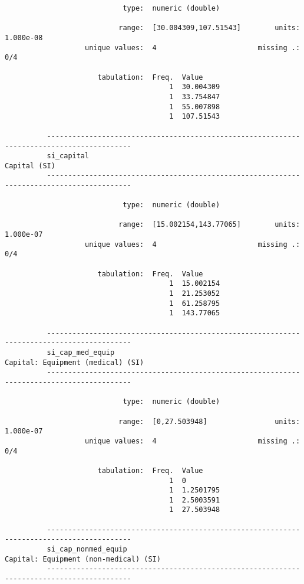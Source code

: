 \documentclass{article}
\begin{document}
\begin{verbatim}
                            type:  numeric (double)
          
                           range:  [30.004309,107.51543]        units:  1.000e-08
                   unique values:  4                        missing .:  0/4
          
                      tabulation:  Freq.  Value
                                       1  30.004309
                                       1  33.754847
                                       1  55.007898
                                       1  107.51543
          
          ------------------------------------------------------------------------------------------
          si_capital                                                                    Capital (SI)
          ------------------------------------------------------------------------------------------
          
                            type:  numeric (double)
          
                           range:  [15.002154,143.77065]        units:  1.000e-07
                   unique values:  4                        missing .:  0/4
          
                      tabulation:  Freq.  Value
                                       1  15.002154
                                       1  21.253052
                                       1  61.258795
                                       1  143.77065
          
          ------------------------------------------------------------------------------------------
          si_cap_med_equip                                         Capital: Equipment (medical) (SI)
          ------------------------------------------------------------------------------------------
          
                            type:  numeric (double)
          
                           range:  [0,27.503948]                units:  1.000e-07
                   unique values:  4                        missing .:  0/4
          
                      tabulation:  Freq.  Value
                                       1  0
                                       1  1.2501795
                                       1  2.5003591
                                       1  27.503948
          
          ------------------------------------------------------------------------------------------
          si_cap_nonmed_equip                                  Capital: Equipment (non-medical) (SI)
          ------------------------------------------------------------------------------------------
          

\end{verbatim}
\end{document}
